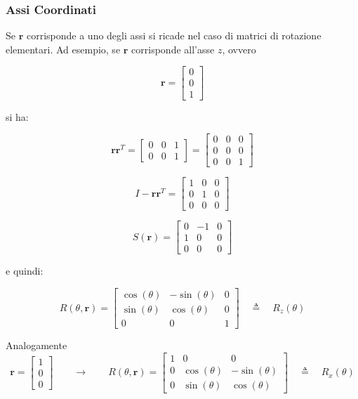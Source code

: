﻿\documentclass[11pt, a4paper]{article}
\begin{document}
\subsubsection*{Assi Coordinati}
Se \(\mathbf{r}\) corrisponde a uno degli assi si ricade nel caso di matrici di rotazione elementari.
Ad esempio, se \(\mathbf{r}\) corrisponde all'asse \(z\), ovvero

\[
\mathbf{r} = \begin{bmatrix}
0 \\
0 \\
1
\end{bmatrix}
\]

si ha:

\[
\mathbf{r} \mathbf{r}^T = \begin{bmatrix}
0 & 0 & 1 \\
0 & 0 & 1
\end{bmatrix}
= \begin{bmatrix}
0 & 0 & 0 \\
0 & 0 & 0 \\
0 & 0 & 1
\end{bmatrix}
\]

\[
I - \mathbf{r} \mathbf{r}^T = \begin{bmatrix}
1 & 0 & 0 \\
0 & 1 & 0 \\
0 & 0 & 0
\end{bmatrix}
\]

\[
S(\mathbf{r}) = \begin{bmatrix}
0 & -1 & 0 \\
1 & 0 & 0 \\
0 & 0 & 0
\end{bmatrix}
\]

e quindi:

\[
R(\theta, \mathbf{r}) = \begin{bmatrix}
\cos(\theta) & -\sin(\theta) & 0 \\
\sin(\theta) & \cos(\theta) & 0 \\
0 & 0 & 1
\end{bmatrix}
\quad \triangleq \quad R_z(\theta)
\]

Analogamente
\[
    \mathbf{r} =
    \begin{bmatrix}
    1 \\
    0 \\
    0
    \end{bmatrix}
    \qquad\longrightarrow\qquad
    R(\theta, \mathbf{r}) = \begin{bmatrix}
    1 & 0 & 0 \\
    0 & \cos(\theta) & -\sin(\theta) \\
    0 & \sin(\theta) & \cos(\theta)
    \end{bmatrix}
    \quad \triangleq \quad R_x(\theta)
\]
\end{document}
